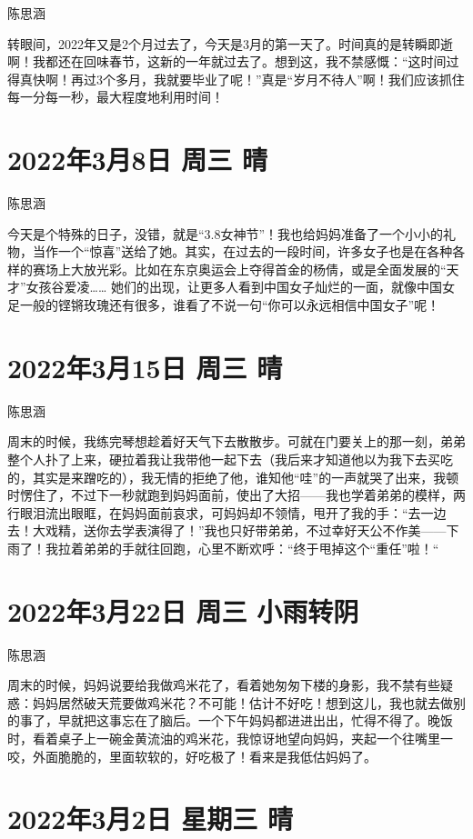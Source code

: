 陈思涵

转眼间，2022年又是2个月过去了，今天是3月的第一天了。时间真的是转瞬即逝啊！我都还在回味春节，这新的一年就过去了。想到这，我不禁感慨：“这时间过得真快啊！再过3个多月，我就要毕业了呢！”真是“岁月不待人”啊！我们应该抓住每一分每一秒，最大程度地利用时间！

\section{2022年3月8日 周三 晴}

陈思涵

今天是个特殊的日子，没错，就是“3.8女神节”！我也给妈妈准备了一个小小的礼物，当作一个“惊喜”送给了她。其实，在过去的一段时间，许多女子也是在各种各样的赛场上大放光彩。比如在东京奥运会上夺得首金的杨倩，或是全面发展的“天才”女孩谷爱凌…… 她们的出现，让更多人看到中国女子灿烂的一面，就像中国女足一般的铿锵玫瑰还有很多，谁看了不说一句“你可以永远相信中国女子”呢！

\section{2022年3月15日 周三 晴}

陈思涵

周末的时候，我练完琴想趁着好天气下去散散步。可就在门要关上的那一刻，弟弟整个人扑了上来，硬拉着我让我带他一起下去（我后来才知道他以为我下去买吃的，其实是来蹭吃的），我无情的拒绝了他，谁知他“哇”的一声就哭了出来，我顿时愣住了，不过下一秒就跑到妈妈面前，使出了大招——我也学着弟弟的模样，两行眼泪流出眼眶，在妈妈面前哀求，可妈妈却不领情，甩开了我的手：“去一边去！大戏精，送你去学表演得了！”我也只好带弟弟，不过幸好天公不作美——下雨了！我拉着弟弟的手就往回跑，心里不断欢呼：“终于甩掉这个“重任”啦！“

\section{2022年3月22日 周三 小雨转阴}

陈思涵

周末的时候，妈妈说要给我做鸡米花了，看着她匆匆下楼的身影，我不禁有些疑惑：妈妈居然破天荒要做鸡米花？不可能！估计不好吃！想到这儿，我也就去做别的事了，早就把这事忘在了脑后。一个下午妈妈都进进出出，忙得不得了。晚饭时，看着桌子上一碗金黄流油的鸡米花，我惊讶地望向妈妈，夹起一个往嘴里一咬，外面脆脆的，里面软软的，好吃极了！看来是我低估妈妈了。

\section{2022年3月2日 星期三 晴}

